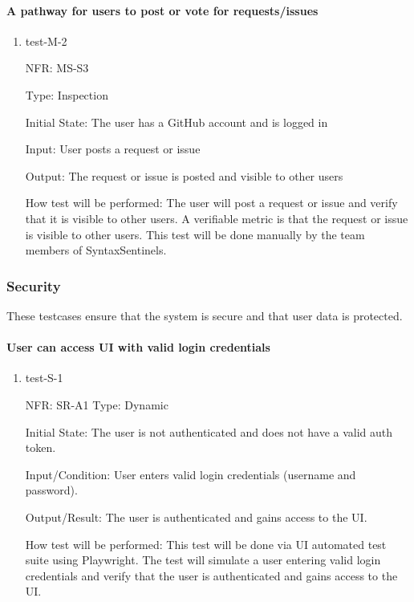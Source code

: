 \documentclass[12pt, titlepage]{article}
\begin{document}
\paragraph{A pathway for users to post or vote for requests/issues}

\begin{enumerate}
  \item{test-M-2}

  NFR: MS-S3

  Type: Inspection

  Initial State: The user has a GitHub account and is logged in

  Input: User posts a request or issue

  Output: The request or issue is posted and visible to other users

  How test will be performed:
  The user will post a request or issue and verify that it is visible to other users. A verifiable metric is that the request or issue is visible to other users.
  This test will be done manually by the team members of SyntaxSentinels.
\end{enumerate}
\subsubsection{Security}
These testcases ensure that the system is secure and that user data is protected.

\paragraph{User can access UI with valid login credentials}
\begin{enumerate}
  \item{test-S-1}

  NFR: SR-A1
  Type: Dynamic
            
  Initial State: The user is not authenticated and does not have a valid auth token.
            
  Input/Condition: User enters valid login credentials (username and password).
            
  Output/Result: The user is authenticated and gains access to the UI.
            
  How test will be performed: 
  This test will be done via UI automated test suite using Playwright. The test will simulate a user entering valid login 
  credentials and verify that the user is authenticated and gains access to the UI.
\end{enumerate}
\end{document}
